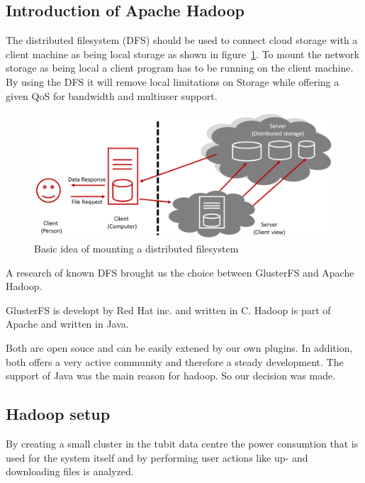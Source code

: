 \subsection{Introduction of Apache Hadoop}

The distributed filesystem (DFS) should be used to connect cloud storage with a client machine as being local storage as shown in figure~\ref{fig:dfs_example}. To mount the network storage as being local a client program has to be running on the client machine. By using the DFS it will remove local limitations on Storage while offering a given QoS for bandwidth and multiuser support.


\begin{figure}
	\centering
	\includegraphics[width=1\linewidth]{img/dfs_example.png}
	\caption{Basic idea of mounting a distributed filesystem}
	\label{fig:dfs_example}
\end{figure}

A research of known DFS brought us the choice between GlusterFS and Apache Hadoop.

GlusterFS is developt by Red Hat inc. and written in C. Hadoop is part of Apache and written in Java.

Both are open souce and can be easily extened by our own plugins. In addition, both offers a very active community and therefore a steady development. The support of Java was the main reason for hadoop. So our decision was made.


\subsection{Hadoop setup}

By creating a small cluster in the tubit data centre the power consumtion that is used for the system itself and by performing user actions like up- and downloading files is analyzed.

